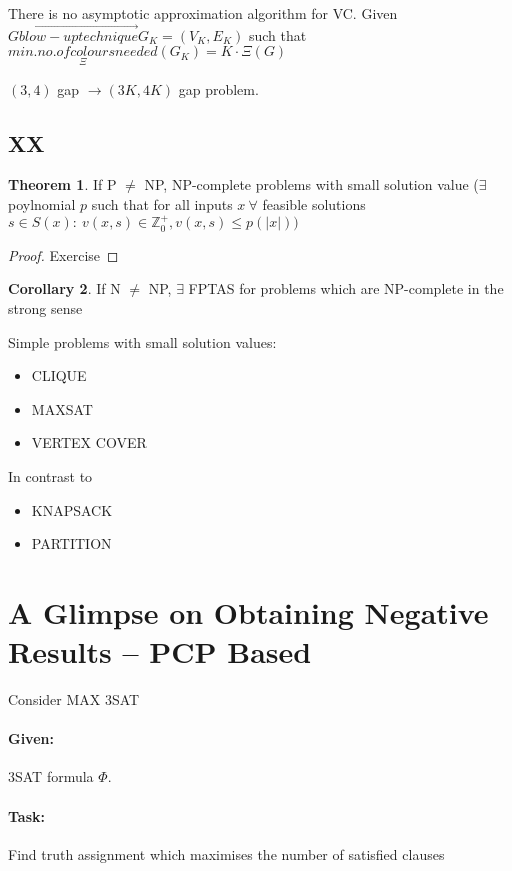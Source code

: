 \documentclass[11pt]{article}
\theoremstyle{definition}
\newtheorem{theorem}{Theorem}[section]
\newtheorem{corollary}[theorem]{Corollary}
\theoremstyle{definition}
\begin{document}
There is no asymptotic approximation algorithm for VC. Given $ G \overset{\rightarrow}{blow-up technique} G_K = (V_K, E_K) $ such that $ \underset{\Xi}{min. no. of colours needed}(G_K) = K \cdot \Xi(G) $

$ (3, 4) $ gap $ \rightarrow (3K, 4K) $ gap problem.

\subsection{XX}

\begin{theorem}
If P $ \neq $ NP, NP-complete problems with small solution value ($ \exists $ poylnomial $ p $ such that for all inputs $ x ~\forall $ feasible solutions $ s \in S(x) : ~ v(x, s) \in \mathbb{Z}_0^+, v(x, s) \leq p(|x|) )$ 
\end{theorem}

\begin{proof}
Exercise
\end{proof}

\begin{corollary}
If N $ \neq $ NP, $ \exists $ FPTAS for problems which are NP-complete in the strong sense 
\end{corollary}

Simple problems with small solution values:
\begin{itemize}
\item CLIQUE
\item MAXSAT
\item VERTEX COVER
\end{itemize} \medskip

In contrast to
\begin{itemize}
\item KNAPSACK
\item PARTITION
\end{itemize}

\section{A Glimpse on Obtaining Negative Results – PCP Based}

Consider MAX 3SAT
\paragraph{Given:} 3SAT formula $ \Phi $.
\paragraph{Task:} Find truth assignment which maximises the number of satisfied clauses
\end{document}
